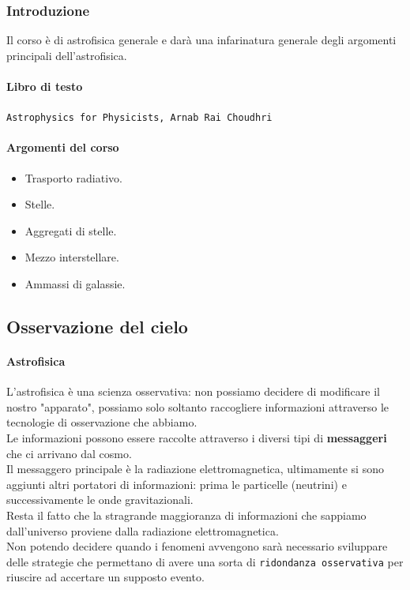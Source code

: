 \subsubsection{Introduzione}%
Il corso è di astrofisica generale e darà una infarinatura generale degli argomenti principali dell'astrofisica.
\paragraph{Libro di testo}%
\texttt{Astrophysics for Physicists, Arnab Rai Choudhri}
\paragraph{Argomenti del corso}%
\begin{itemize}
	\item Trasporto radiativo.
	\item Stelle.
	\item Aggregati di stelle.
	\item Mezzo interstellare.
	\item Ammassi di galassie.
\end{itemize}
\subsection{Osservazione del cielo}%
\paragraph{Astrofisica}%
L'astrofisica è una scienza osservativa: non possiamo decidere di modificare il nostro "apparato", possiamo solo soltanto raccogliere informazioni attraverso le tecnologie di osservazione che abbiamo.\\
Le informazioni possono essere raccolte attraverso i diversi tipi di \textbf{messaggeri} che ci arrivano dal cosmo.\\
Il messaggero principale è la radiazione elettromagnetica, ultimamente si sono aggiunti altri portatori di informazioni: prima le particelle (neutrini) e successivamente le onde gravitazionali.\\ 
Resta il fatto che la stragrande maggioranza di informazioni che sappiamo dall'universo proviene dalla radiazione elettromagnetica.\\ 
Non potendo decidere quando i fenomeni avvengono sarà necessario sviluppare delle strategie che permettano di avere una sorta di \texttt{ridondanza osservativa} per riuscire ad accertare un supposto evento.

